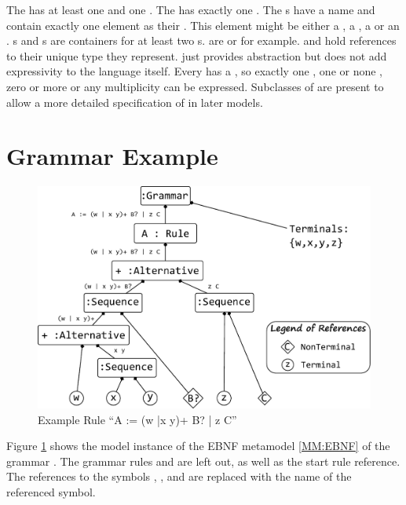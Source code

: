 The  has at least one  and one . The  has exactly one . The s have a name and contain exactly one element as their . This element might be either a , a , a  or an . s and s are containers for at least two s.  are  or  for example.  and  hold references to their unique type they represent.  just provides abstraction but does not add expressivity to the language itself. Every  has a , so exactly one , one or none , zero or more \code{+} or any multiplicity \code{*} can be expressed. Subclasses of  are present to allow a more detailed specification of  in later models.



\section{Grammar Example}
\begin{figure}
\centering
\includegraphics[scale=0.7]{gfx/ex/grammarExample} 
\caption{Example Rule ``A := (w |x y)+ B? | z C''}
\label{MM:GrammarExample}
\end{figure}
Figure \ref{MM:GrammarExample} shows the model instance of the EBNF metamodel \ref{MM:EBNF} of the grammar  . The grammar rules  and  are left out, as well as the start rule reference. The references to the symbols , ,  and  are replaced with the name of the referenced symbol.

